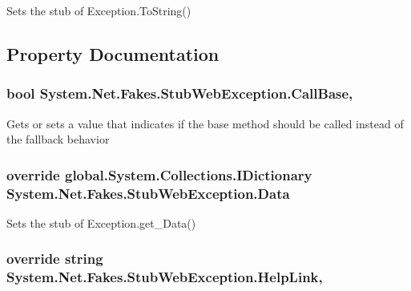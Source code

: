 Sets the stub of Exception.\-To\-String()



\subsection{Property Documentation}
\hypertarget{class_system_1_1_net_1_1_fakes_1_1_stub_web_exception_a4bf51e959b4359bca781fb596564dcd3}{
\subsubsection[{Call\-Base}]{\setlength{\rightskip}{0pt plus 5cm}bool System.\-Net.\-Fakes.\-Stub\-Web\-Exception.\-Call\-Base\hspace{0.3cm}{\ttfamily [get]}, {\ttfamily [set]}}}\label{class_system_1_1_net_1_1_fakes_1_1_stub_web_exception_a4bf51e959b4359bca781fb596564dcd3}


Gets or sets a value that indicates if the base method should be called instead of the fallback behavior

\hypertarget{class_system_1_1_net_1_1_fakes_1_1_stub_web_exception_a578e86c688d3e88715da127e5fcb1ce0}{
\subsubsection[{Data}]{\setlength{\rightskip}{0pt plus 5cm}override global.\-System.\-Collections.\-I\-Dictionary System.\-Net.\-Fakes.\-Stub\-Web\-Exception.\-Data\hspace{0.3cm}{\ttfamily [get]}}}\label{class_system_1_1_net_1_1_fakes_1_1_stub_web_exception_a578e86c688d3e88715da127e5fcb1ce0}


Sets the stub of Exception.\-get\-\_\-\-Data()

\hypertarget{class_system_1_1_net_1_1_fakes_1_1_stub_web_exception_af479238bd25ecc77543cfd79198d4f9f}{
\subsubsection[{Help\-Link}]{\setlength{\rightskip}{0pt plus 5cm}override string System.\-Net.\-Fakes.\-Stub\-Web\-Exception.\-Help\-Link\hspace{0.3cm}{\ttfamily [get]}, {\ttfamily [set]}}}\label{class_system_1_1_net_1_1_fakes_1_1_stub_web_exception_af479238bd25ecc77543cfd79198d4f9f}


